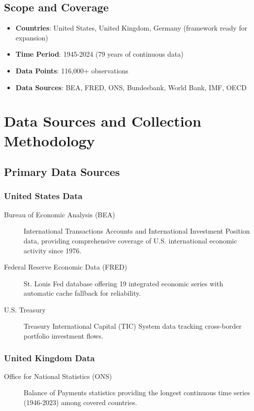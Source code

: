 \documentclass[11pt,a4paper]{article}
\begin{document}
\subsection{Scope and Coverage}
\begin{itemize}
    \item \textbf{Countries}: United States, United Kingdom, Germany (framework ready for expansion)
    \item \textbf{Time Period}: 1945-2024 (79 years of continuous data)
    \item \textbf{Data Points}: 116,000+ observations
    \item \textbf{Data Sources}: BEA, FRED, ONS, Bundesbank, World Bank, IMF, OECD
\end{itemize}

\section{Data Sources and Collection Methodology}

\subsection{Primary Data Sources}

\subsubsection{United States Data}
\begin{description}
    \item[Bureau of Economic Analysis (BEA)] International Transactions Accounts and International Investment Position data, providing comprehensive coverage of U.S. international economic activity since 1976.
    \item[Federal Reserve Economic Data (FRED)] St. Louis Fed database offering 19 integrated economic series with automatic cache fallback for reliability.
    \item[U.S. Treasury] Treasury International Capital (TIC) System data tracking cross-border portfolio investment flows.
\end{description}

\subsubsection{United Kingdom Data}
\begin{description}
    \item[Office for National Statistics (ONS)] Balance of Payments statistics providing the longest continuous time series (1946-2023) among covered countries.
\end{description}
\end{document}
